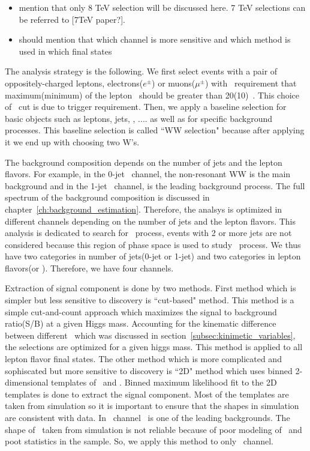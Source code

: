 
\begin{itemize} 
\item mention that only 8 TeV selection will be discussed here. 7 TeV selections 
      can be referred to [7TeV paper?].
\item should mention that which channel is more sensitive and which method is used 
      in which final states 
\end{itemize} 



The analysis strategy is the following. We first select events with 
a pair of oppositely-charged leptons, electrons($e^\pm$) or muons($\mu^\pm$) 
with \pt\ requirement that maximum(minimum) of the lepton \pt\ should be 
greater than 20(10)~\GeV. This choice of \pt\ cut is due to trigger requirement. 
Then, we apply a baseline selection for basic objects such as leptons, jets, \met, .... 
as well as for specific background processes. This baseline selection is called 
``WW selection" because after applying it we end up with choosing two W's.   

The background composition depends on the number of jets and the lepton flavors. 
For example, in the 0-jet \DF\ channel, the non-resonant WW is the main 
background and in the 1-jet \DF\ channel, \topbkg is the leading background process. 
The full spectrum of the background composition is discussed in chapter~\ref{ch:background_estimation}. 
Therefore, the analsys is optimized in different channels depending on  
the number of jets and the lepton flavors. This analysis is dedicated 
to search for \ggH\ process, events with 2 or more jets are not considered 
because this region of phase space is used to study \qqH\ process. 
We thus have two categories in number of jets(0-jet or 1-jet) 
and two categories in lepton flavors(\DF or \SF). 
Therefore, we have four channels.

Extraction of signal component is done by two methods. First method which is simpler
but less sensitive to discovery is ``cut-based" method. This method is a simple cut-and-count approach 
which maximizes the signal to background ratio(S/B) at a given Higgs mass. Accounting for the 
kinematic difference between different \mHi\ which was discussed in 
section~\ref{subsec:kinimetic_variables}, the selections are optimized for a 
given higgs mass. This method is applied to all lepton flavor final states. 
The other method which is more complicated and sophiscated but more sensitive to discovery 
is ``2D" method which uses binned 2-dimensional templates of \mT\ and \mll. 
Binned maximum likelihood fit to the 2D templates is done to extract 
the signal component. Most of the templates are taken from simulation 
so it is important to ensure that the shapes in simulation are consistent 
with data. In \SF\ channel \dyll\ is one of the leading backgrounds. 
The shape of \dyll\ taken from simulation is not reliable because of 
poor modeling of \met\ and poot statistics in the sample. So, we apply 
this method to only \DF\ channel. 



